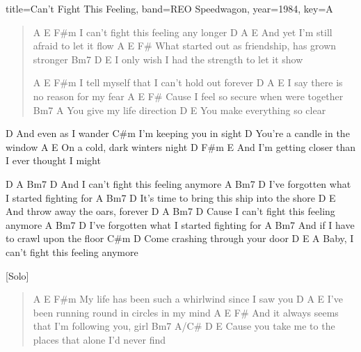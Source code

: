 \documentclass{skrul-leadsheet}
\begin{document}
\begin{song}[transpose-capo=true]{title={Can't Fight This Feeling}, band={REO Speedwagon}, year={1984}, key={A}}

\begin{verse}
A                  E           F#m
I can't fight this feeling any longer
    D             A                E
And yet I'm still afraid to let it flow
     A              E                     F#
What started out as friendship, has grown stronger
       Bm7            D                  E
I only wish I had the strength to let it show
 
A                    E              F#m
I tell myself that I can't hold out forever
  D               A             E
I say there is no reason for my fear
        A       E                F#
Cause I feel so secure when were together
Bm7                A
You give my life direction
         D             E
You make everything so clear

\end{verse} 
 
\begin{bridge}
D
And even as I wander
    C#m
I'm keeping you in sight
         D
You're a candle in the window
     A                  E
On a cold, dark winters night
    D                       F#m              E
And I'm getting closer than I ever thought I might

\end{bridge} 
 
\begin{bridge}
    D                  A          Bm7 D
And I can't fight this feeling anymore
                       A               Bm7  D
I've forgotten what I started fighting for
                        A             Bm7  D
It's time to bring this ship into the shore
    D                    E
And throw away the oars, forever
      D                  A          Bm7 D
Cause I can't fight this feeling anymore
                        A              Bm7 D
I've forgotten what I started fighting for
                 A               Bm7
And if I have to crawl upon the floor
     C#m                   D
Come crashing through your door
      D                  E           A
Baby, I can't fight this feeling anymore
\end{bridge}
 
[Solo]
 
 
\begin{verse}
A                       E                 F#m
My life has been such a whirlwind since I saw you
           D                A             E
I've been running round in circles in my mind
        A                     E        F#
And it always seems that I'm following you, girl
          Bm7            A/C#         D              E
Cause you take me to the places that alone I'd never find


\end{verse}
\end{song}
\end{document}
